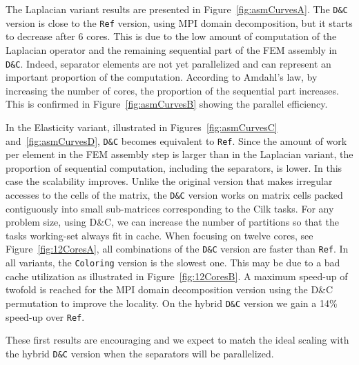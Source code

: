 \documentclass[10pt]{IOS-Book-Article}
\begin{document}
The Laplacian variant results are presented in Figure~\ref{fig:asmCurvesA}. The {\tt D\&C} version is close to the {\tt Ref} version, using MPI domain decomposition, but it starts to decrease after 6 cores.
This is due to the low amount of computation of the Laplacian operator and the remaining sequential part of the FEM assembly in {\tt D\&C}.
Indeed, separator elements are not yet parallelized and can represent an important proportion of the computation.
According to Amdahl's law, by increasing the number of cores, the proportion of the sequential part increases.
This is confirmed in Figure~\ref{fig:asmCurvesB} showing the parallel efficiency.

In the Elasticity variant, illustrated in Figures~\ref{fig:asmCurvesC} and~\ref{fig:asmCurvesD}, {\tt D\&C} becomes equivalent to {\tt Ref}.
Since the amount of work per element in the FEM assembly step is larger than in the Laplacian variant, the proportion of sequential computation, including the separators, is lower.
In this case the scalability improves.
Unlike the original version that makes irregular accesses to the cells of the matrix, the {\tt D\&C} version works on matrix cells packed contiguously into small sub-matrices corresponding to the Cilk tasks.
For any problem size, using D\&C, we can increase the number of partitions so that the tasks working-set always fit in cache.
When focusing on twelve cores, see Figure~\ref{fig:12CoresA}, all combinations of the {\tt D\&C} version are faster than {\tt Ref}. In all variants, the {\tt Coloring} version is the slowest one. This may be due to a bad cache utilization as illustrated in Figure~\ref{fig:12CoresB}. A maximum speed-up of twofold is reached for the MPI domain decomposition version using the D\&C permutation to improve the locality. On the hybrid {\tt D\&C} version we gain a 14\% speed-up over {\tt Ref}.


These first results are encouraging and we expect to match the ideal scaling with the hybrid {\tt D\&C} version when the separators will be parallelized.
\end{document}

